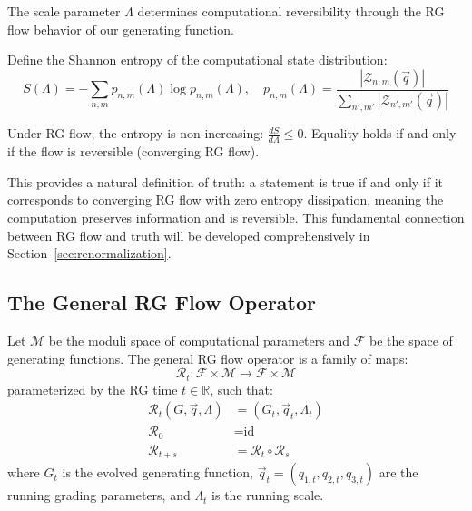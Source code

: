 The scale parameter $\Lambda$ determines computational reversibility through the RG flow behavior of our generating function. 

\begin{definition}
\label{def:information-monotone}
Define the Shannon entropy of the computational state distribution:
\[
S(\Lambda) = -\sum_{n,m} p_{n,m}(\Lambda) \log p_{n,m}(\Lambda), \quad p_{n,m}(\Lambda) = \frac{|\mathcal{Z}_{n,m}(\vec{q})|}{\sum_{n',m'} |\mathcal{Z}_{n',m'}(\vec{q})|}
\]
\end{definition}

\begin{theorem}
\label{thm:entropy-monotonicity}
Under RG flow, the entropy is non-increasing: $\frac{dS}{d\Lambda} \leq 0$. Equality holds if and only if the flow is reversible (converging RG flow).
\end{theorem}

This provides a natural definition of truth: a statement is true if and only if it corresponds to converging RG flow with zero entropy dissipation, meaning the computation preserves information and is reversible. This fundamental connection between RG flow and truth will be developed comprehensively in Section~\ref{sec:renormalization}.

\subsection{The General RG Flow Operator}

\begin{definition}
\label{def:general-rg-operator}
Let $\mathcal{M}$ be the moduli space of computational parameters and $\mathcal{F}$ be the space of generating functions. The general RG flow operator is a family of maps:
\[
\mathcal{R}_t: \mathcal{F} \times \mathcal{M} \to \mathcal{F} \times \mathcal{M}
\]
parameterized by the RG time $t \in \mathbb{R}$, such that:
\begin{align}
\mathcal{R}_t(G, \vec{q}, \Lambda) &= (G_t, \vec{q}_t, \Lambda_t) \\
\mathcal{R}_0 &= \text{id} \\
\mathcal{R}_{t+s} &= \mathcal{R}_t \circ \mathcal{R}_s
\end{align}
where $G_t$ is the evolved generating function, $\vec{q}_t = (q_{1,t}, q_{2,t}, q_{3,t})$ are the running grading parameters, and $\Lambda_t$ is the running scale.
\end{definition}

